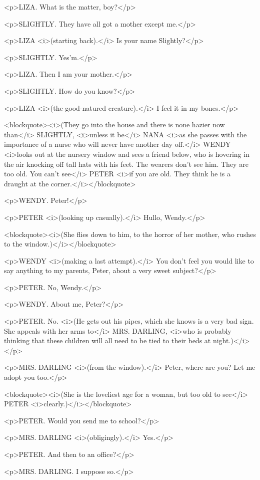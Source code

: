 <p>LIZA. What is the matter, boy?</p>

<p>SLIGHTLY. They have all got a mother except me.</p>

<p>LIZA <i>(starting back).</i> Is your name Slightly?</p>

<p>SLIGHTLY. Yes'm.</p>

<p>LIZA. Then I am your mother.</p>

<p>SLIGHTLY. How do you know?</p>

<p>LIZA <i>(the good-natured creature).</i> I feel it in my bones.</p>

<blockquote><i>(They go into the house and there is none hazier now than</i> SLIGHTLY, <i>unless it be</i> NANA <i>as she passes with the importance of a nurse who will never have another day off.</i> WENDY <i>looks out at the nursery window and sees a friend below, who is hovering in the air knocking off tall hats with his feet. The wearers don't see him. They are too old. You can't see</i> PETER <i>if you are old. They think he is a draught at the corner.</i></blockquote>

<p>WENDY. Peter!</p>

<p>PETER <i>(looking up casually).</i> Hullo, Wendy.</p>

<blockquote><i>(She flies down to him, to the horror of her mother, who rushes to the window.)</i></blockquote>

<p>WENDY <i>(making a last attempt).</i> You don't feel you would like to say anything to my parents, Peter, about a very sweet subject?</p>

<p>PETER. No, Wendy.</p>

<p>WENDY. About me, Peter?</p>

<p>PETER. No. <i>(He gets out his pipes, which she knows is a very bad sign. She appeals with her arms to</i> MRS. DARLING, <i>who is probably thinking that these children will all need to be tied to their beds at night.)</i></p>

<p>MRS. DARLING <i>(from the window).</i> Peter, where are you? Let me adopt you too.</p>

<blockquote><i>(She is the loveliest age for a woman, but too old to see</i> PETER <i>clearly.)</i></blockquote>

<p>PETER. Would you send me to school?</p>

<p>MRS. DARLING <i>(obligingly).</i> Yes.</p>

<p>PETER. And then to an office?</p>

<p>MRS. DARLING. I suppose so.</p>


